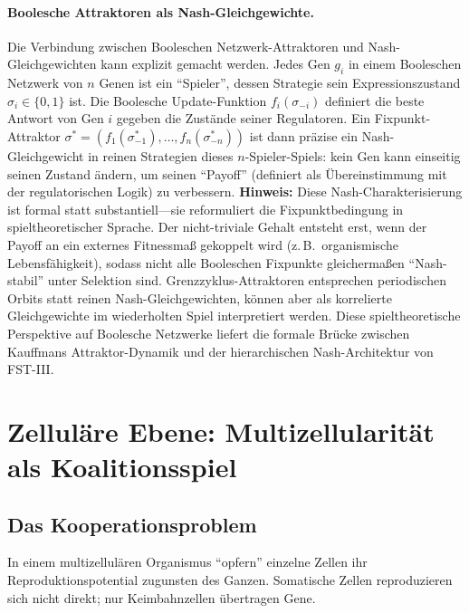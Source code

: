 \documentclass[12pt,a4paper]{article}
\theoremstyle{remark}
\begin{document}
\paragraph{Boolesche Attraktoren als Nash-Gleichgewichte.}
Die Verbindung zwischen Booleschen Netzwerk-Attraktoren und Nash-Gleichgewichten kann explizit gemacht werden. Jedes Gen $g_i$ in einem Booleschen Netzwerk von $n$ Genen ist ein ``Spieler'', dessen Strategie sein Expressionszustand $\sigma_i \in \{0, 1\}$ ist. Die Boolesche Update-Funktion $f_i(\sigma_{-i})$ definiert die beste Antwort von Gen $i$ gegeben die Zust\"ande seiner Regulatoren. Ein Fixpunkt-Attraktor $\sigma^* = (f_1(\sigma^*_{-1}), \dots, f_n(\sigma^*_{-n}))$ ist dann pr\"azise ein Nash-Gleichgewicht in reinen Strategien dieses $n$-Spieler-Spiels: kein Gen kann einseitig seinen Zustand \"andern, um seinen ``Payoff'' (definiert als \"Ubereinstimmung mit der regulatorischen Logik) zu verbessern. \textbf{Hinweis:} Diese Nash-Charakterisierung ist formal statt substantiell---sie reformuliert die Fixpunktbedingung in spieltheoretischer Sprache. Der nicht-triviale Gehalt entsteht erst, wenn der Payoff an ein externes Fitnessma\ss{} gekoppelt wird (z.\,B.\ organismische Lebensfähigkeit), sodass nicht alle Booleschen Fixpunkte gleicherma\ss{}en ``Nash-stabil'' unter Selektion sind. Grenzzyklus-Attraktoren entsprechen periodischen Orbits statt reinen Nash-Gleichgewichten, k\"onnen aber als korrelierte Gleichgewichte im wiederholten Spiel interpretiert werden. Diese spieltheoretische Perspektive auf Boolesche Netzwerke liefert die formale Br\"ucke zwischen Kauffmans Attraktor-Dynamik und der hierarchischen Nash-Architektur von FST-III.

\section{Zellul\"are Ebene: Multizellularit\"at als Koalitionsspiel}
\label{sec:multicellularity}

\subsection{Das Kooperationsproblem}

In einem multizellul\"aren Organismus ``opfern'' einzelne Zellen ihr Reproduktionspotential zugunsten des Ganzen. Somatische Zellen reproduzieren sich nicht direkt; nur Keimbahnzellen \"ubertragen Gene.
\end{document}
